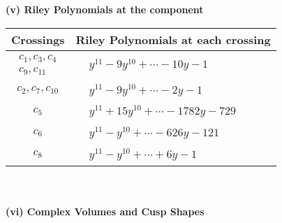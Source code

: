 \documentclass[1p]{elsarticle_modified}
\theoremstyle{definition}
\begin{document}
\flushleft \textbf{(v) Riley Polynomials at the component}\newline \\
\begin{tabular}{m{50pt}|m{274pt}}
Crossings & \hspace{64pt}Riley Polynomials at each crossing \\
\hline $$\begin{aligned}c_{1},c_{3},c_{4}\\c_{9},c_{11}\end{aligned}$$&$\begin{aligned}
&y^{11}-9 y^{10}+\cdots-10 y-1
\end{aligned}$\\
\hline $$\begin{aligned}c_{2},c_{7},c_{10}\end{aligned}$$&$\begin{aligned}
&y^{11}-9 y^{10}+\cdots-2 y-1
\end{aligned}$\\
\hline $$\begin{aligned}c_{5}\end{aligned}$$&$\begin{aligned}
&y^{11}+15 y^{10}+\cdots-1782 y-729
\end{aligned}$\\
\hline $$\begin{aligned}c_{6}\end{aligned}$$&$\begin{aligned}
&y^{11}- y^{10}+\cdots-626 y-121
\end{aligned}$\\
\hline $$\begin{aligned}c_{8}\end{aligned}$$&$\begin{aligned}
&y^{11}- y^{10}+\cdots+6 y-1
\end{aligned}$\\
\hline
\end{tabular}\\~\\
\newpage\flushleft \textbf{(vi) Complex Volumes and Cusp Shapes}
\end{document}
